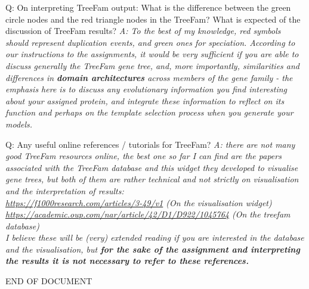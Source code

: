 \documentclass[10pt,a4paper]{article}
\begin{document}
Q: On interpreting TreeFam output: What is the difference between the green circle nodes and the red triangle nodes in the TreeFam? What is expected of the discussion of TreeFam results? \newline
\textit{A: To the best of my knowledge, red symbols should represent duplication events, and green ones for speciation. According to our instructions to the assignments, it would be very sufficient if you are able to discuss generally the TreeFam gene tree, and, more importantly, similarities and differences in \textbf{domain architectures} across members of the gene family - the emphasis here is to discuss any evolutionary information you find interesting about your assigned protein, and integrate these information to reflect on its function and perhaps on the template selection process when you generate your models.} \newline

Q: Any useful online references / tutorials for TreeFam? \newline
\textit{A: there are not many good TreeFam resources online, the best one so far I can find are the papers associated with the TreeFam database and this widget they developed to visualise gene trees, but both of them are rather technical and not strictly on visualisation and the interpretation of results: \\
\url{https://f1000research.com/articles/3-49/v1} (On the visualisation widget) \\
\url{https://academic.oup.com/nar/article/42/D1/D922/1045764} (On the treefam database) \\
I believe these will be (very) extended reading if you are interested in the database and the visualisation, but \textbf{for the sake of the assignment and interpreting the results it is not necessary to refer to these references.}} \newline

 
\begin{center}
\textsc{END OF DOCUMENT}
\end{center}
\end{document}
